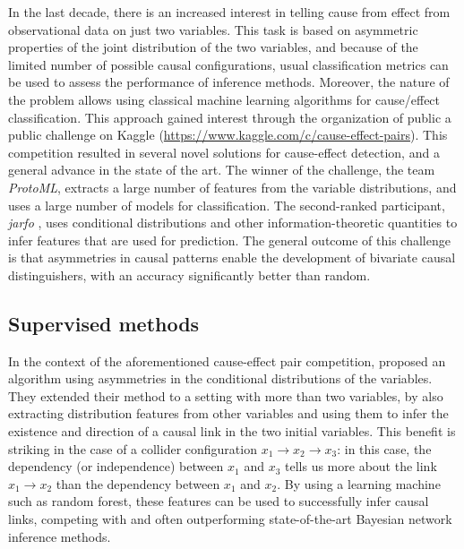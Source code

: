 In the last decade, there is an increased interest in telling cause from effect
from observational data on just two variables. This task is based on asymmetric
properties of the joint distribution of the two variables, and because of the
limited number of possible causal configurations, usual classification metrics
can be used to assess the performance of inference methods. Moreover, the nature
of the problem allows using classical machine learning algorithms for
cause/effect classification. This approach gained interest through the
organization of public a public challenge on Kaggle
(\url{https://www.kaggle.com/c/cause-effect-pairs}). This competition resulted
in several novel solutions for cause-effect detection, and a general advance in
the state of the art. The winner of the challenge, the team \emph{ProtoML},
extracts a large number of features from the variable distributions, and uses a
large number of models for classification. The second-ranked participant,
\emph{jarfo} \cite{fonollosa2016conditional}, uses conditional distributions and
other information-theoretic quantities to infer features that are used for
prediction. The general outcome of this challenge is that asymmetries in causal
patterns enable the development of bivariate causal distinguishers, with an
accuracy significantly better than random.

\subsection{Supervised methods}

In the context of the aforementioned cause-effect pair competition,
\textcite{bontempi2015dependency} proposed an algorithm using asymmetries in the
conditional distributions of the variables. They extended their method to a
setting with more than two variables, by also extracting distribution features
from other variables and using them to infer the existence and direction of a
causal link in the two initial variables. This benefit is striking in the case
of a collider configuration $x_1 \to x_2 \to x_3$: in this case, the dependency
(or independence) between $x_1$ and $x_3$ tells us more about the link $x_1 \to
x_2$ than the dependency between $x_1$ and $x_2$. By using a learning machine
such as random forest, these features can be used to successfully infer causal
links, competing with and often outperforming state-of-the-art Bayesian network
inference methods.

